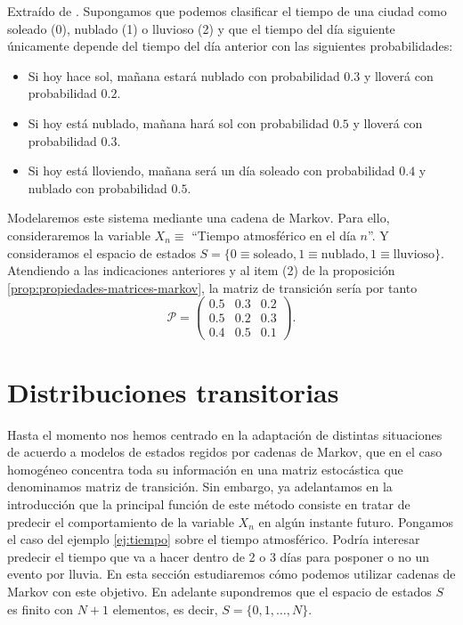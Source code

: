 \begin{ejemplo}
    \label{ej:tiempo}
    Extraído de \cite[Ch. 2, Example 2.3]{kulkarni-2012}. Supongamos que podemos clasificar el tiempo de una ciudad como soleado (0), nublado (1) o lluvioso (2) y que el tiempo del día siguiente únicamente depende del tiempo del día anterior con las siguientes probabilidades:
    \begin{itemize}
        \item Si hoy hace sol, mañana estará nublado con probabilidad $0.3$ y lloverá con probabilidad $0.2$.
        \item Si hoy está nublado, mañana hará sol con probabilidad $0.5$ y lloverá con probabilidad $0.3$.
        \item Si hoy está lloviendo, mañana será un día soleado con probabilidad $0.4$ y nublado con probabilidad $0.5$.
    \end{itemize}

    Modelaremos este sistema mediante una cadena de Markov. Para ello, consideraremos la variable $X_n \equiv$ ``Tiempo atmosférico en el día $n$''. Y consideramos el espacio de estados $S = \{ 0\equiv\text{soleado}, 1\equiv\text{nublado}, 1\equiv\text{lluvioso}\}$. Atendiendo a las indicaciones anteriores y al item (2) de la proposición \ref{prop:propiedades-matrices-markov}, la matriz de transición sería por tanto
    $$ \mathcal P =\begin{pmatrix}
        0.5 & 0.3 & 0.2 \\
        0.5 & 0.2 & 0.3 \\
        0.4 & 0.5 & 0.1
    \end{pmatrix}.
    $$

\end{ejemplo}

\section{Distribuciones transitorias}

Hasta el momento nos hemos centrado en la adaptación de distintas situaciones de acuerdo a modelos de estados regidos por cadenas de Markov, que en el caso homogéneo concentra toda su información en una matriz estocástica que denominamos matriz de transición. Sin embargo, ya adelantamos en la introducción que la principal función de este método consiste en tratar de predecir el comportamiento de la variable $X_n$ en algún instante futuro. Pongamos el caso del ejemplo \ref{ej:tiempo} sobre el tiempo atmosférico. Podría interesar predecir el tiempo que va a hacer dentro de 2 o 3 días para posponer o no un evento por lluvia. En esta sección estudiaremos cómo podemos utilizar cadenas de Markov con este objetivo. En adelante supondremos que el espacio de estados $S$ es finito con $N+1$ elementos, es decir, $S=\{0,1,\dots,N\}$.

